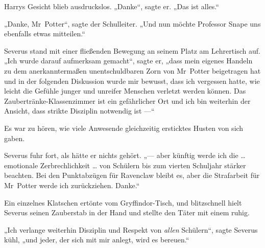 Harrys Gesicht blieb ausdruckslos.
„Danke“, sagte er.
„Das ist alles.“

„Danke, Mr~Potter“, sagte der Schulleiter.
„Und nun möchte Professor Snape uns ebenfalls etwas mitteilen.“

Severus stand mit einer fließenden Bewegung an seinem Platz am Lehrertisch auf.
„Ich wurde darauf aufmerksam gemacht“, sagte er, „dass mein eigenes Handeln zu dem anerkanntermaßen unentschuldbaren Zorn von Mr~Potter beigetragen hat und in der folgenden Diskussion wurde mir bewusst, dass ich vergessen hatte, wie leicht die Gefühle junger und unreifer Menschen verletzt werden können. Das Zaubertränke-Klassenzimmer ist ein gefährlicher Ort und ich bin weiterhin der Ansicht, dass strikte Disziplin notwendig ist —“

Es war zu hören, wie viele Anwesende gleichzeitig ersticktes Husten von sich gaben.

Severus fuhr fort, als hätte er nichts gehört. „— aber künftig werde ich die … emotionale Zerbrechlichkeit … von Schülern bis zum vierten Schuljahr stärker beachten. Bei den Punktabzügen für Ravenclaw bleibt es, aber die Strafarbeit für Mr~Potter werde ich zurückziehen. Danke.“

Ein einzelnes Klatschen ertönte vom Gryffindor-Tisch, und blitzschnell hielt Severus seinen Zauberstab in der Hand und stellte den Täter mit einem  ruhig.

„Ich verlange weiterhin Disziplin und Respekt von \emph{allen} Schülern“, sagte Severus kühl, „und jeder, der sich mit mir anlegt, wird es bereuen.“

